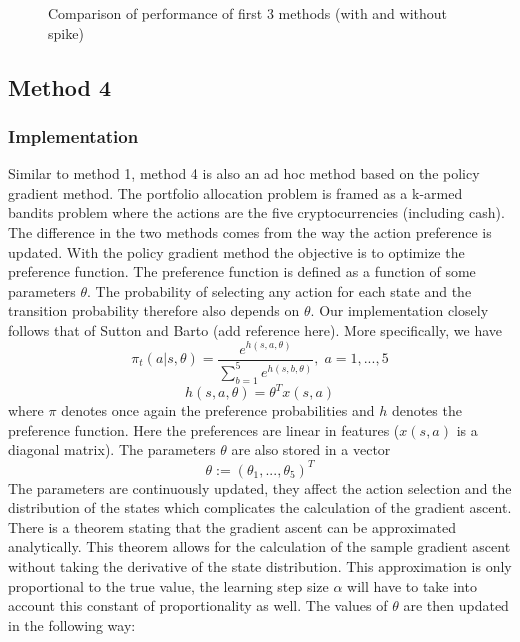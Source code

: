 \documentclass[a4paper,12pt]{article}
\begin{document}
\begin{figure}[h!]
\begin{subfigure}[b]{0.4\linewidth}
  \end{subfigure}
  \caption{Comparison of performance of first 3 methods (with and without spike)}
  \label{fig:comparison}
\end{figure}

\subsection{Method 4}

\subsubsection{Implementation}
Similar to method 1, method 4 is also an ad hoc method based on the policy gradient method. The portfolio allocation problem is framed as a k-armed bandits problem where the actions are the five cryptocurrencies (including cash). The difference in the two methods comes from the way the action preference is updated.  With the policy gradient method the objective is to optimize the preference function. The preference function is defined as a function of some parameters $\theta$. The probability of selecting any action for each state and the transition probability therefore also depends on $\theta$. Our implementation closely follows that of Sutton and Barto (add reference here). More specifically, we have
\begin{equation}
\pi_t (a|s,\theta)  = \frac{e^{h(s,a,\theta)}}{\sum_{b=1}^{5} e^{h(s,b,\theta)}}, \; a=1,...,5
\end{equation}
\begin{equation}
h(s,a,\theta) = \theta^T x(s,a)
\end{equation}
where $\pi$ denotes once again the preference probabilities and $h$ denotes the preference function. Here the preferences are linear in features ($x(s,a)$ is a diagonal matrix). The parameters $\theta$ are also stored in a vector
\begin{equation}
\theta := (\theta_1,...,\theta_5)^T
\end{equation}
The parameters are continuously updated, they affect the action selection and the distribution of the states which complicates the calculation of the gradient ascent. There is a theorem stating that the gradient ascent can be approximated analytically. This theorem allows for the calculation of the sample gradient ascent without taking the derivative of the state distribution. This approximation is only proportional to the true value, the learning step size $\alpha$ will have to take into account this constant of proportionality as well. The values of $\theta$ are then updated in the following way:
\end{document}

